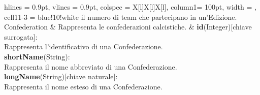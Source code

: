 \begin{tblr}{
    hlines = {0.9pt}, vlines = {0.9pt}, colspec = {X[l]X[l]X[l]}, column{1}= {100pt},
    width = \textwidth, cell{1}{1-3} = {blue!10!white}
}
{			il numero di team che partecipano in un'Edizione.
	}
	\\
	{
		Confederation
	}
	&
	{
	Rappresenta le confederazioni calcistiche.
	}
	& 
	{
		\textbf{id}(Integer)[chiave surrogata]:\\Rappresenta
			l'identificativo di una Confederazione.\\
		\medskip\textbf{shortName}(String):\\Rappresenta
			il nome abbreviato di una Confederazione.\\
		\medskip\textbf{longName}(String)[chiave naturale]:
			\\Rappresenta il nome esteso di una Confederazione.
	}
	\\
\end{tblr}

\newpage

